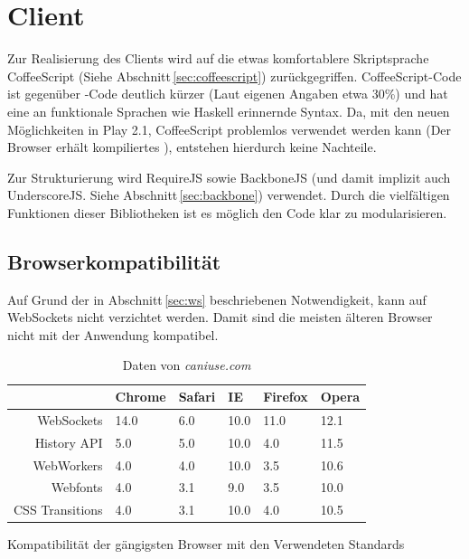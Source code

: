 \section{Client}

Zur Realisierung des Clients wird auf die etwas komfortablere Skriptsprache CoffeeScript (Siehe
Abschnitt\,\ref{sec:coffeescript}) zurückgegriffen. CoffeeScript-Code ist gegenüber -Code
deutlich kürzer (Laut eigenen Angaben etwa 30\%) und hat eine an funktionale Sprachen wie Haskell
erinnernde Syntax. Da, mit den neuen Möglichkeiten in Play 2.1, CoffeeScript problemlos verwendet
werden kann (Der Browser erhält kompiliertes ), entstehen hierdurch keine Nachteile.

Zur Strukturierung wird RequireJS sowie BackboneJS (und damit implizit auch UnderscoreJS. Siehe
Abschnitt\,\ref{sec:backbone}) verwendet. Durch die vielfältigen Funktionen dieser Bibliotheken ist
es möglich den Code klar zu modularisieren.

\subsection{Browserkompatibilität}
\label{sec:comp}

Auf Grund der in Abschnitt\,\ref{sec:ws} beschriebenen Notwendigkeit, kann auf WebSockets nicht
verzichtet werden. Damit sind die meisten älteren Browser nicht mit der Anwendung kompatibel.

\begin{table}[h]
\centering
\begin{tabular}{rlllll}
                  & \textbf{Chrome} & \textbf{Safari} & \textbf{IE} & \textbf{Firefox} 
                  & \textbf{Opera} \\\hline
  WebSockets      & 14.0            & 6.0             & 10.0        & 11.0             & 12.1  \\
  History API     & 5.0             & 5.0             & 10.0        & 4.0              & 11.5  \\
  WebWorkers      & 4.0             & 4.0             & 10.0        & 3.5              & 10.6  \\
  Webfonts        & 4.0             & 3.1             & 9.0         & 3.5              & 10.0  \\
  CSS Transitions & 4.0             & 3.1             & 10.0        & 4.0              & 10.5  \\  

\end{tabular}
\caption{Kompatibilität der gängigsten Browser mit den Verwendeten Standards}
  \caption*{Daten von \textit{caniuse.com}}
\label{tab:comp}
\end{table}

